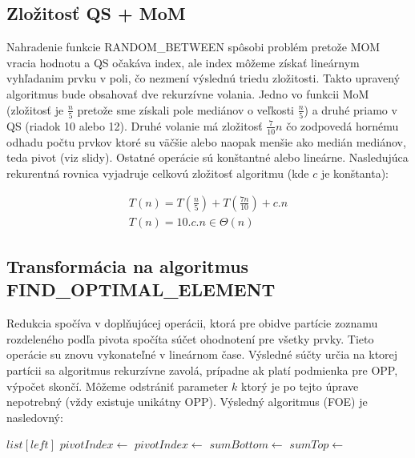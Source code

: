 \documentclass[paper=a4, fontsize=11pt]{scrartcl} %
\numberwithin{equation}{section} %
\numberwithin{figure}{section} %
\numberwithin{table}{section} %
\begin{document}
\subsection*{Zložitosť QS + MoM}
Nahradenie funkcie RANDOM\_BETWEEN spôsobi problém pretože MOM vracia hodnotu a QS očakáva index, ale index môžeme získať lineárnym vyhľadanim prvku v poli, čo nezmení výslednú triedu zložitosti. Takto upravený algoritmus bude obsahovať dve rekurzívne volania. Jedno vo funkcii MoM (zložitosť je $\frac{n}{5}$ pretože sme získali pole mediánov o veľkosti $\frac{n}{5}$) a druhé priamo v QS (riadok 10 alebo 12). Druhé volanie má zložitosť $\frac{7}{10} n$ čo  zodpovedá hornému odhadu počtu prvkov ktoré su väčšie alebo naopak menšie ako medián mediánov, teda pivot (viz slidy). Ostatné operácie sú konštantné alebo lineárne. Nasledujúca rekurentná rovnica vyjadruje celkovú zložitosť algoritmu (kde $c$ je konštanta):

\begin{equation}
    \begin{aligned}
        T(n) = T\left(\frac{n}{5}\right) + T\left(\frac{7n}{10}\right)+c.n \\
        T(n) = 10.c.n \in \Theta(n)
    \end{aligned}
\end{equation}

\subsection*{Transformácia na algoritmus FIND\_OPTIMAL\_ELEMENT}
Redukcia spočíva v doplňujúcej operácii, ktorá pre obidve partície zoznamu rozdeleného podľa pivota spočíta súčet ohodnotení pre všetky prvky. Tieto operácie su znovu vykonateľné v lineárnom čase. Výsledné súčty určia na ktorej partícii sa algoritmus rekurzívne zavolá, prípadne ak platí podmienka pre OPP, výpočet skončí. Môžeme odstrániť parameter $k$ ktorý je po tejto úprave nepotrebný (vždy existuje unikátny OPP). Výsledný algoritmus (FOE) je nasledovný: \\

\begin{algorithmic}[1]
            \State \Return $list[left]$
        \EndIf
       	\State $pivotIndex \gets$ 
        \State $pivotIndex \gets$ 
        \State $sumBottom \gets$ 
        \State $sumTop \gets$ 
            \State \Return {}
        \Else
            \State \Return {}        
        \EndIf
    \EndFunction \\
    	\State \Return {}    
    \EndFunction
\end{algorithmic}
\end{document}
